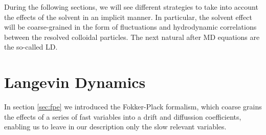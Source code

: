 \documentclass[ twoside,openright,titlepage,numbers=noenddot,%
headinclude,footinclude,cleardoublepage=empty,abstract=on,
BCOR=5mm,paper=a4,fontsize=11pt, dvipsnames
]{scrreprt}
\begin{document}
%
During the following sections, we will see different strategies to take into account the effects of the solvent in an implicit manner. In particular, the solvent effect will be coarse-grained in the form of fluctuations and hydrodynamic correlations between the resolved colloidal particles.
The next natural after \gls{MD} equations are the so-called \gls{LD}.

\chapter{Langevin Dynamics}\label{sec:langevin}

In section \ref{sec:fpe} we introduced the Fokker-Plack formalism, which coarse grains the effects of a series of fast variables into a drift and diffussion coefficients, enabling us to leave in our description only the slow relevant variables.
\end{document}
